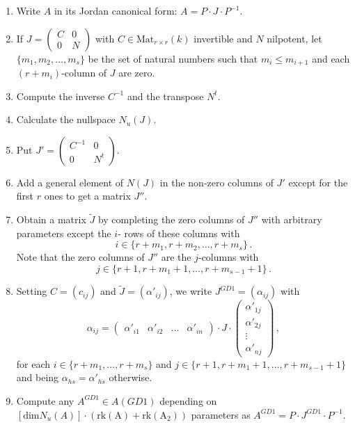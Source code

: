 \documentclass[10pt,a4paper]{amsart}
\theoremstyle{plain}
\theoremstyle{remark}
\numberwithin{equation}{section} \numberwithin{defn}{section}
\begin{document}
\begin{enumerate}

\item Write $A$ in its Jordan canonical form: $A = P\cdot J \cdot P^{-1}$. \medskip

\item If $J = \begin{pmatrix} C & 0 \\ 0 & N \end{pmatrix}$ with $C\in \text{Mat}_{r\times r} (k)$ invertible and $N$ nilpotent, let $\{m_1, m_2, \dots, m_s\}$ be the set of natural numbers such that $m_i \leq m_{i+1}$ and each $(r+m_i)$-column of $J$ are zero.  \smallskip

\item Compute the inverse $C^{-1}$ and the transpose $N^t.$

\item Calculate the nullspace $N_u(J)$.\smallskip

\item Put $J' = \begin{pmatrix} C^{-1} & 0 \\ 0 & N^t \end{pmatrix}$.

\item\label{eq: item6enumer} Add a general element of $N(J)$ in the non-zero columns of $J'$ except for the first $r$ ones to get a matrix $J''$. 

\item Obtain a matrix $\tilde {J}$ by completing the zero columns of $J''$ with arbitrary parameters except the $i$- rows of these columns with $$i\in \{ r+ m_1, r+ m_2, \dots, r+ m_{s}\}\, .$$\noindent Note that the zero columns of $J''$ are the $j$-columns with $$j\in \{ r+ 1, r+ m_1 +1, \dots, r+ m_{s-1} +1\}\, .$$

\item Setting $C = (c_{ij})$ and ${\tilde J} = (\alpha'_{ij})$, we write $J^{GD1} = (\alpha_{ij})$ with $$\alpha_{ij} = \begin{pmatrix} \alpha'_{i1} & \alpha'_{i2} & \dots & \alpha'_{in} \end{pmatrix} \cdot J \cdot \begin{pmatrix} \alpha'_{1j} \\ \alpha'_{2j} \\ \vdots \\ \alpha'_{nj} \end{pmatrix}  \, ,$$\noindent for each $i\in \{ r+ m_1, \dots, r+ m_{s}\}$ and $j\in \{ r+ 1, r+ m_1 +1, \dots, r+ m_{s-1} +1\}$ and being $\alpha_{hs} = \alpha'_{hs}$ otherwise. \medskip

\item Compute any $A^{GD1} \in A(GD1)$ depending on $[\mathrm{dim } N_u(A)]\cdot (\mathrm{rk (A)}+\mathrm{rk (A_2)}) $ parameters as $A^{GD1} = P\cdot J^{GD1}\cdot P^{-1}$.
\end{enumerate} 
\end{document}
